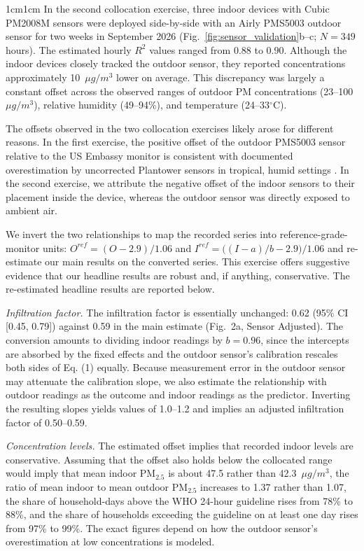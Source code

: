 \documentclass[9pt,twoside]{pnas-new}
\begin{document}
\begin{adjustwidth}{1cm}{1cm}
In the second collocation exercise, three indoor devices with Cubic PM2008M sensors were deployed side-by-side with an Airly PMS5003 outdoor sensor for two weeks in September 2026 (Fig.~\ref{fig:sensor_validation}b--c; $N = 349$ hours). The estimated hourly $R^2$ values ranged from $0.88$ to $0.90$. Although the indoor devices closely tracked the outdoor sensor, they reported concentrations approximately 10~$\mu g/m^3$ lower on average. This discrepancy was largely a constant offset across the observed ranges of outdoor PM concentrations (23--100~$\mu g/m^3$), relative humidity (49--94\%), and temperature (24--33$^\circ$C).

The offsets observed in the two collocation exercises likely arose for different reasons. In the first exercise, the positive offset of the outdoor PMS5003 sensor relative to the US Embassy monitor is consistent with documented overestimation by uncorrected Plantower sensors in tropical, humid settings \citep{hossain_performance_2025, Wulandari2024}. In the second exercise, we attribute the negative offset of the indoor sensors to their placement inside the device, whereas the outdoor sensor was directly exposed to ambient air.

We invert the two relationships to map the recorded series into reference-grade-monitor units: $O^{ref} = (O - 2.9)/1.06$ and $I^{ref} = \big((I - a)/b - 2.9\big)/1.06$ and re-estimate our main results on the converted series. This exercise offers suggestive evidence that our headline results are robust and, if anything, conservative. The re-estimated headline results are reported below.

\vspace{.3cm}
\textit{Infiltration factor.} The infiltration factor is essentially unchanged: 0.62 (95\% CI [0.45, 0.79]) against 0.59 in the main estimate (Fig.~2a, Sensor Adjusted). The conversion amounts to dividing indoor readings by $b = 0.96$, since the intercepts are absorbed by the fixed effects and the outdoor sensor's calibration rescales both sides of Eq. (1) equally. Because measurement error in the outdoor sensor may attenuate the calibration slope, we also estimate the relationship with outdoor readings as the outcome and indoor readings as the predictor. Inverting the resulting slopes yields values of 1.0--1.2 and implies an adjusted infiltration factor of 0.50--0.59.

\textit{Concentration levels.} The estimated offset implies that recorded indoor levels are conservative. Assuming that the offset also holds below the collocated range would imply that mean indoor PM$_{2.5}$ is about 47.5 rather than 42.3~$\mu g/m^3$, the ratio of mean indoor to mean outdoor PM$_{2.5}$ increases to 1.37 rather than 1.07, the share of household-days above the WHO 24-hour guideline rises from 78\% to 88\%, and the share of households exceeding the guideline on at least one day rises from 97\% to 99\%. The exact figures depend on how the outdoor sensor's overestimation at low concentrations is modeled.


\end{adjustwidth}
\end{document}
